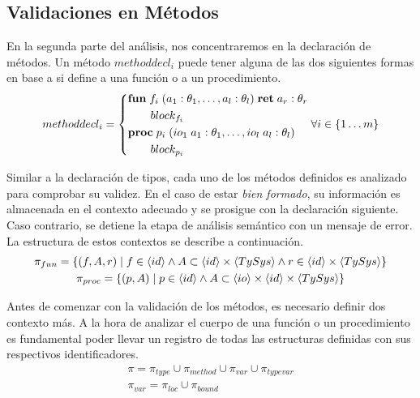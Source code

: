 \documentclass{article}
\begin{document}
\begin{prooftree}
\end{prooftree}

\subsection{Validaciones en Métodos}

En la segunda parte del análisis, nos concentraremos en la declaración de métodos.
Un método $methoddecl_i$ puede tener alguna de las dos siguientes formas en base a si define a una función o a un procedimiento.
\begin{gather*}
methoddecl_i =
\begin{cases*}
\T{fun} \; f_i \; (a_1: \theta_1, \ldots, a_l: \theta_l) \; \T{ret} \; a_r: \theta_r
\\
\qquad block_{f_i}
\\
\T{proc} \; p_i \; (io_1 \; a_1: \theta_1, \ldots, io_l \; a_l: \theta_l)
\\
\qquad block_{p_i}
\end{cases*}
\forall i \in \{ 1 \ldots m \}
\end{gather*}

Similar a la declaración de tipos, cada uno de los métodos definidos es analizado para comprobar su validez.
En el caso de estar \textit{bien formado}, su información es almacenada en el contexto adecuado y se prosigue con la declaración siguiente.
Caso contrario, se detiene la etapa de análisis semántico con un mensaje de error.
La estructura de estos contextos se describe a continuación.
\begin{gather*}
\pi_{fun} =
\{
(f, A, r) \mid
f \in \NT{id}
\wedge
A \subset \NT{id} \times \NT{TySys}
\wedge
r \in \NT{id} \times \NT{TySys}
\}
\\
\pi_{proc} =
\{
(p, A) \mid
p \in \NT{id}
\wedge
A \subset \NT{io} \times \NT{id} \times \NT{TySys}
\}
\end{gather*}

Antes de comenzar con la validación de los métodos, es necesario definir dos contexto más.
A la hora de analizar el cuerpo de una función o un procedimiento es fundamental poder llevar un registro de todas las estructuras definidas con sus respectivos identificadores.
\begin{gather*}
\pi = \pi_{type} \cup \pi_{method} \cup \pi_{var} \cup \pi_{typevar}
\\
\pi_{var} = \pi_{loc} \cup \pi_{bound}
\end{gather*}
\end{document}
